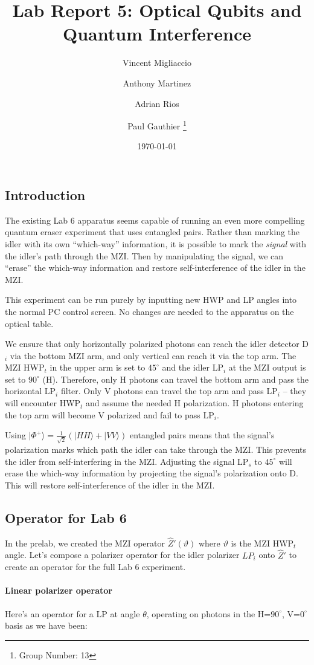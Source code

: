 \documentclass{article}
\title{Lab Report 5: Optical Qubits and Quantum Interference}
\author{
  Vincent Migliaccio \and
  Anthony Martinez \and
  Adrian Rios \and
  Paul Gauthier
  \thanks{Group Number: 13} \\
}
\date{\today}
\begin{document}
\pagestyle{empty}



\subsection*{Introduction}

The existing Lab 6 apparatus seems capable of running an even more compelling quantum
eraser experiment that uses entangled pairs.
Rather than marking the idler with its own ``which-way'' information, it is possible
to mark the \emph{signal} with the idler's path through the MZI.
Then by manipulating the signal, we can ``erase'' the which-way information
and restore self-interference of the idler in the MZI.

This experiment can be run purely by inputting new HWP and LP angles
into the normal PC control screen.
No changes are needed to the apparatus on the optical table.

We ensure that only horizontally polarized photons
can reach the idler detector D$_i$ via the bottom MZI arm,
and only vertical can reach it via the top arm.
The MZI HWP$_t$ in the upper arm is set to $45^\circ$ and the idler LP$_i$ at the
MZI output is set to $90^\circ$ (H).
Therefore, only H photons can travel the bottom arm
and pass the horizontal LP$_i$ filter.
Only V photons can travel the top arm and pass LP$_i$
-- they will encounter HWP$_t$ and assume the needed H polarization.
H photons entering the top arm will become V polarized
and fail to pass LP$_i$.

Using $| \Phi^+ \rangle = \frac{1}{\sqrt2}(|HH\rangle + |VV\rangle)$
entangled pairs means that the signal's polarization marks which
path the idler can take through the MZI.
This prevents the idler from self-interfering in the MZI.
Adjusting the signal LP$_s$ to $45^\circ$ will erase the which-way information
by projecting the signal's polarization onto D.
This will restore self-interference of the idler in the MZI.

\subsection*{Operator for Lab 6}

In the prelab, we created the MZI operator $\hat{Z}'(\vartheta)$
where $\vartheta$ is the MZI HWP$_t$ angle.
Let's compose a polarizer operator for the idler polarizer
$LP_i$ onto $\hat{Z}'$
to create an operator for the full Lab 6 experiment.

\paragraph{Linear polarizer operator}
Here's an operator for a LP at angle $\theta$,
operating on photons in the H=$90^\circ$, V=$0^\circ$ basis as we have been:
\end{document}
